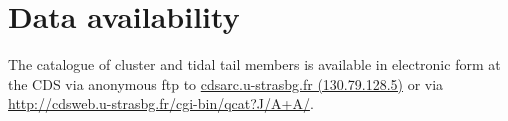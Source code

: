 \documentclass{aa}
\begin{document}

\section*{Data availability}
The catalogue of cluster and tidal tail members is available in electronic form at the CDS via anonymous ftp to \href{https://cdsarc.u-strasbg.fr}{cdsarc.u-strasbg.fr (130.79.128.5)} or via \href{http://cdsweb.u-strasbg.fr/cgi-bin/qcat?J/A+A/}{http://cdsweb.u-strasbg.fr/cgi-bin/qcat?J/A+A/}.
\end{document}

